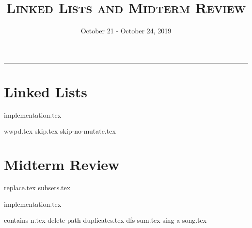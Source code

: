 \documentclass{exam}
\title{\textsc{Linked Lists and Midterm Review}}
\date{October 21 - October 24, 2019}
\begin{document}
\maketitle
\rule{\textwidth}{0.15em}
\fontsize{12}{15}\selectfont

\section{Linked Lists}
{implementation.tex}
\newpage
\begin{questions}
{wwpd.tex}
\newpage
{skip.tex}
{skip-no-mutate.tex}
\end{questions}

\section{Midterm Review}
\begin{questions}
{replace.tex}
{subsets.tex}
\end{questions}
\newpage
{implementation.tex}
\vspace{\baselineskip}
\begin{questions}
{contains-n.tex}
{delete-path-duplicates.tex}
\newpage
{dfs-sum.tex}
{sing-a-song.tex}

\end{questions}
\end{document}
